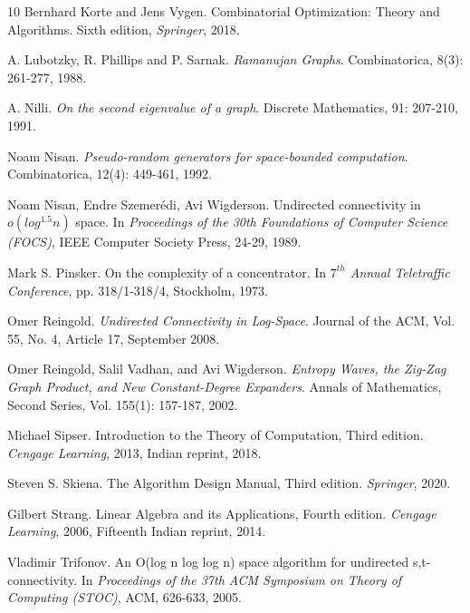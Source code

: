 \documentclass{article}
\begin{document}
\begin{thebibliography}{10}
{\sc Bernhard Korte and Jens Vygen}. {Combinatorial Optimization: Theory and Algorithms}. Sixth edition, {\em Springer}, 2018.

{\sc A. Lubotzky, R. Phillips and P. Sarnak}. {\em Ramanujan Graphs}. Combinatorica, 8(3): 261-277, 1988.

{\sc A. Nilli}. {\em On the second eigenvalue of a graph}. Discrete Mathematics, 91: 207-210, 1991.

{\sc Noam Nisan}. {\em Pseudo-random generators for space-bounded computation}. Combinatorica, 12(4): 449-461, 1992.

{\sc Noam Nisan, Endre Szemer\'{e}di, Avi Wigderson}. {Undirected connectivity in $o(log ^{1.5}n)$ space}. In {\em Proceedings of the 30th Foundations of Computer Science (FOCS)}, IEEE Computer Society Press, 24-29, 1989.

{\sc Mark S. Pinsker}. {On the complexity of a concentrator}. In {\em $7^{th}$ Annual Teletraffic Conference}, pp. 318/1-318/4, Stockholm, 1973.

{\sc Omer Reingold}. {\em Undirected Connectivity in Log-Space}. Journal of the ACM, Vol. 55, No. 4, Article 17, September 2008.

{\sc Omer Reingold, Salil Vadhan, and Avi Wigderson}. {\em Entropy Waves, the Zig-Zag Graph Product, and New Constant-Degree Expanders}. Annals of Mathematics, Second Series, Vol. 155(1): 157-187, 2002.

{\sc Michael Sipser}. {Introduction to the Theory of Computation}, Third edition. {\em Cengage Learning}, 2013, Indian reprint, 2018.

{\sc Steven S. Skiena}. {The Algorithm Design Manual}, Third edition. {\em Springer}, 2020.

{\sc Gilbert Strang}. {Linear Algebra and its Applications}, Fourth edition. {\em Cengage Learning}, 2006, Fifteenth Indian reprint, 2014.

{\sc Vladimir Trifonov}. {An O(log n log log n) space algorithm for undirected s,t-connectivity}. In {\em Proceedings of the 37th ACM Symposium on Theory of Computing (STOC)}, ACM, 626-633, 2005.

\end{thebibliography}
\end{document}

